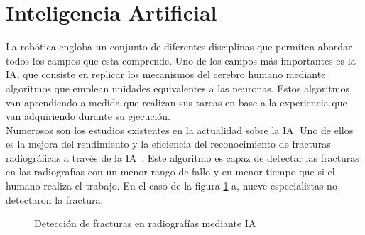 \section{Inteligencia Artificial}
La robótica engloba un conjunto de diferentes disciplinas que permiten abordar todos los campos que esta comprende. Uno de los campos más importantes es la IA, que consiste en replicar los mecanismos del cerebro humano mediante algoritmos que emplean unidades equivalentes a las neuronas. Estos algoritmos van aprendiendo a medida que realizan sus tareas en base a la experiencia que van adquiriendo durante su ejecución.\\
Numerosos son los estudios existentes en la actualidad sobre la IA. Uno de ellos es la mejora del rendimiento y la eficiencia  del reconocimiento de fracturas radiográficas a través de la IA~\cite{radiografias}. Este algoritmo es capaz de detectar las fracturas en las radiografías con un menor rango de fallo y en menor tiempo que si el humano realiza el trabajo. En el caso de la figura \ref{fig:rads}-a, nueve especialistas no detectaron la fractura, 
\begin{figure}[h!]
  \begin{center}
    \hspace{2mm}
  \end{center}
\caption{Detección de fracturas en radiografías mediante IA} \label{fig:rads}
\end{figure}\\

